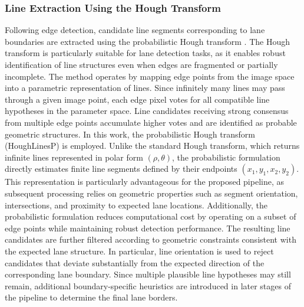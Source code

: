 \subsubsection{Line Extraction Using the Hough Transform}
Following edge detection, candidate line segments corresponding to lane boundaries are extracted using the probabilistic Hough transform \cite{matas2000probabilistic}. The Hough transform \cite{Duda1972UseOT} is particularly suitable for lane detection tasks, as it enables robust identification of line structures even when edges are fragmented or partially incomplete. The method operates by mapping edge points from the image space into a parametric representation of lines. Since infinitely many lines may pass through a given image point, each edge pixel votes for all compatible line hypotheses in the parameter space. Line candidates receiving strong consensus from multiple edge points accumulate higher votes and are identified as probable geometric structures.
In this work, the probabilistic Hough transform (HoughLinesP) is employed. Unlike the standard Hough transform, which returns infinite lines represented in polar form $(\rho,\theta)$, the probabilistic formulation directly estimates finite line segments defined by their endpoints $(x_1, y_1, x_2, y_2)$. This representation is particularly advantageous for the proposed pipeline, as subsequent processing relies on geometric properties such as segment orientation, intersections, and proximity to expected lane locations. Additionally, the probabilistic formulation reduces computational cost by operating on a subset of edge points while maintaining robust detection performance.
The resulting line candidates are further filtered according to geometric constraints consistent with the expected lane structure. In particular, line orientation is used to reject candidates that deviate substantially from the expected direction of the corresponding lane boundary. Since multiple plausible line hypotheses may still remain, additional boundary-specific heuristics are introduced in later stages of the pipeline to determine the final lane borders.


